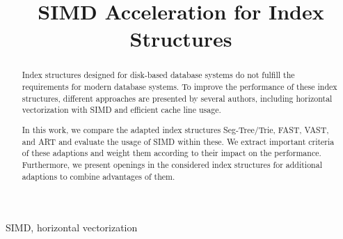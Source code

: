 \documentclass[conference]{IEEEtran}
\begin{document}
\title{SIMD Acceleration for Index Structures\\
}

\author{
}

\maketitle

\begin{abstract}
Index structures designed for disk-based database systems do not fulfill the requirements for modern database systems. To improve the performance of these index structures, different approaches are presented by several authors, including horizontal vectorization with SIMD and efficient cache line usage. 

In this work, we compare the adapted index structures Seg-Tree/Trie, FAST, VAST, and ART and evaluate the usage of SIMD within these. We extract important criteria of these adaptions and weight them according to their impact on the performance. Furthermore, we present openings in the considered index structures for additional adaptions to combine advantages of them.
\end{abstract}

\begin{IEEEkeywords}
SIMD, horizontal vectorization
\end{IEEEkeywords}
\end{document}
